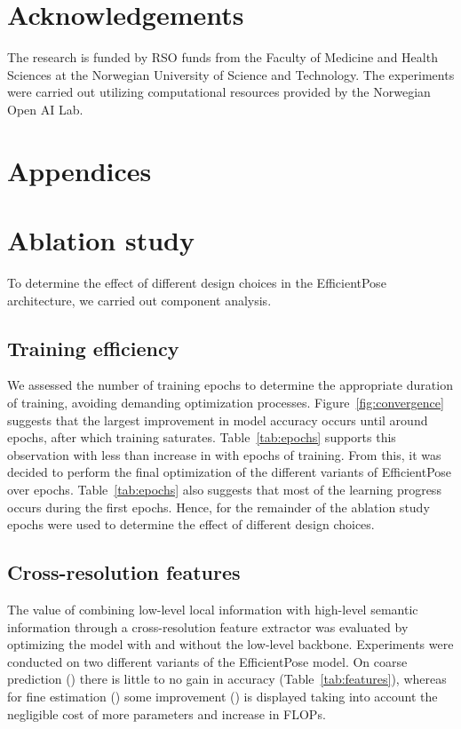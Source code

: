 \section*{Acknowledgements}
\label{sec:acknowledgements}

The research is funded by RSO funds from the Faculty of Medicine and Health Sciences at the Norwegian University of Science and Technology. The experiments were carried out utilizing computational resources provided by the Norwegian Open AI Lab.




       

\appendix
\section*{Appendices}
\section{Ablation study}
\label{sec:ablation}

To determine the effect of different design choices in the EfficientPose architecture, we carried out component analysis. 

\subsection*{Training efficiency}
\label{sec:training}

We assessed the number of training epochs to determine the appropriate duration of training, avoiding demanding optimization processes. Figure~\ref{fig:convergence} suggests that the largest improvement in model accuracy occurs until around  epochs, after which training saturates. Table~\ref{tab:epochs} supports this observation with less than  increase in  with  epochs of training. From this, it was decided to perform the final optimization of the different variants of EfficientPose over  epochs. Table~\ref{tab:epochs} also suggests that most of the learning progress occurs during the first  epochs. Hence, for the remainder of the ablation study  epochs were used to determine the effect of different design choices.

\subsection*{Cross-resolution features}
\label{sec:features}

The value of combining low-level local information with high-level semantic information through a cross-resolution feature extractor was evaluated by optimizing the model with and without the low-level backbone. Experiments were conducted on two different variants of the EfficientPose model. On coarse prediction () there is little to no gain in accuracy (Table~\ref{tab:features}), whereas for fine estimation () some improvement () is displayed taking into account the negligible cost of  more parameters and  increase in FLOPs. 

